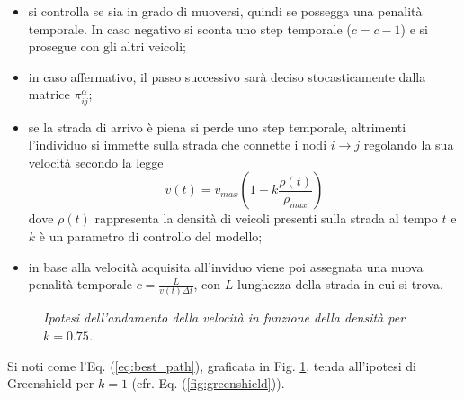 \documentclass[../main.tex]{subfiles}
\begin{document}
\begin{itemize}
    \item si controlla se sia in grado di muoversi, quindi se possegga una penalit\`a temporale. In caso negativo si sconta uno step temporale ($c = c -1$) e si prosegue con gli altri veicoli;
    \item in caso affermativo, il passo successivo sarà deciso stocasticamente dalla matrice $\pi_{ij}^{\alpha}$;
    \item se la strada di arrivo \`e piena si perde uno step temporale, altrimenti l'individuo si immette sulla strada che connette i nodi $i \to j$ regolando la sua velocit\`a secondo la legge 
    \begin{equation}
        v(t) = v_{max}\left(1-k\frac{\rho(t)}{\rho_{max}}\right)
        \label{eq:velocity}
    \end{equation}
    dove $\rho(t)$ rappresenta la densit\`a di veicoli presenti sulla strada al tempo $t$ e $k$ \`e un parametro di controllo del modello;
    \item in base alla velocit\`a acquisita all'inviduo viene poi assegnata una nuova penalit\`a temporale $c = \frac{L}{v(t)\Delta t}$, con $L$ lunghezza della strada in cui si trova.
\end{itemize}
\begin{figure}[H]
    \centering
    \caption[Velocit\`a nel modello]{\emph{Ipotesi dell'andamento della velocit\`a in funzione della densit\`a per $k = 0.75$.}}
    \label{fig:velocity}
\end{figure}
Si noti come l'Eq. (\ref{eq:best_path}), graficata in Fig. \ref{fig:velocity}, tenda all'ipotesi di Greenshield per $k = 1$ (cfr. Eq. (\ref{fig:greenshield})).
\end{document}
